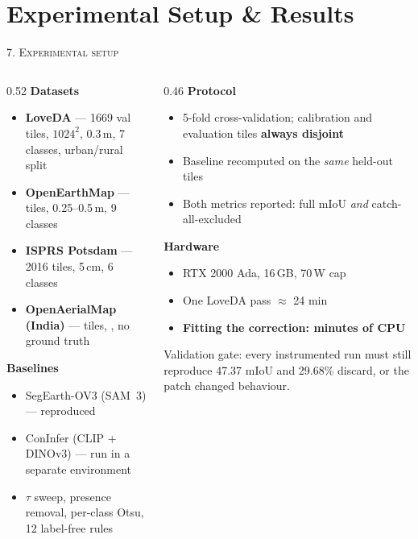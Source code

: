 \documentclass[aspectratio=169]{beamer}
\newcommand{\best}[1]{\textcolor{acc}{\textbf{#1}}}
\newcommand{\bad}[1]{\textcolor{warn}{#1}}
\begin{document}
\section{Experimental Setup \& Results}
\begin{frame}{\textsc{7. Experimental setup}}
\begin{columns}[T]
\begin{column}{0.52\textwidth}
\textbf{Datasets}
\begin{itemize}\small
  \item \textbf{LoveDA} --- 1669 val tiles, $1024^2$, 0.3\,m, 7 classes,
        urban/rural split
  \item \textbf{OpenEarthMap} --- \oemTiles{} tiles, 0.25--0.5\,m, 9 classes
  \item \textbf{ISPRS Potsdam} --- 2016 tiles, 5\,cm, 6 classes
  \item \textbf{OpenAerialMap (India)} --- \indTiles{} tiles, \indGSD{},
        \bad{no ground truth}
\end{itemize}
\vspace{0.5em}
\textbf{Baselines}
\begin{itemize}\small
  \item SegEarth-OV3 (SAM~3) --- reproduced
  \item ConInfer (CLIP + DINOv3) --- run in a separate environment
  \item $\tau$ sweep, presence removal, per-class Otsu, 12 label-free rules
\end{itemize}
\end{column}
\begin{column}{0.46\textwidth}
\textbf{Protocol}
\begin{itemize}\small
  \item 5-fold cross-validation; calibration and evaluation tiles
        \best{always disjoint}
  \item Baseline recomputed on the \emph{same} held-out tiles
  \item Both metrics reported: full mIoU \emph{and} catch-all-excluded
\end{itemize}
\vspace{0.5em}
\textbf{Hardware}
\begin{itemize}\small
  \item RTX 2000 Ada, 16\,GB, 70\,W cap
  \item One LoveDA pass $\approx$ 24 min
  \item \best{Fitting the correction: minutes of CPU}
\end{itemize}
\vspace{0.5em}
\footnotesize\bad{Validation gate:} every instrumented run must still reproduce
47.37 mIoU and 29.68\% discard, or the patch changed behaviour.
\end{column}
\end{columns}
\end{frame}
\end{document}
